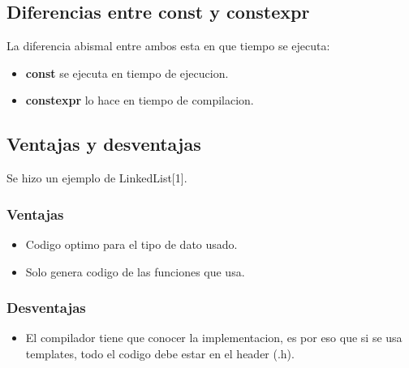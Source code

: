 \subsection{Diferencias entre const y constexpr}
La diferencia abismal entre ambos esta en que tiempo se ejecuta:
\begin{itemize}
    \item \textbf{const} se ejecuta en tiempo de ejecucion.
    \item \textbf{constexpr} lo hace en tiempo de compilacion.
\end{itemize}

\subsection{Ventajas y desventajas}
Se hizo un ejemplo de LinkedList[1].
\subsubsection{Ventajas}
\begin{itemize}
    \item Codigo optimo para el tipo de dato usado.
    \item Solo genera codigo de las funciones que usa.
\end{itemize}
\subsubsection{Desventajas}
\begin{itemize}
    \item El compilador tiene que conocer la implementacion, es por eso que si se usa templates,
    todo el codigo debe estar en el header (.h).
\end{itemize}